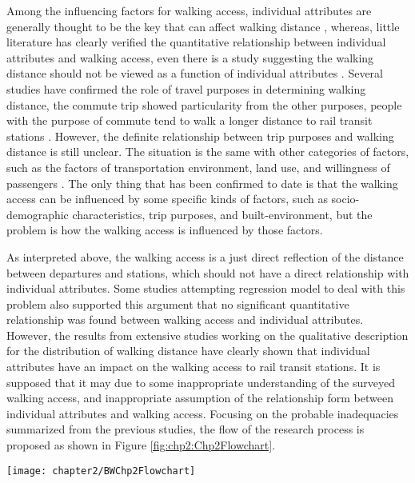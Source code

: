 %
Among the influencing factors for walking access, individual attributes are generally thought to be the key that can affect walking distance \cite{besser2005walking,weinstein2008far,krygsman2004multimodal,yang2012walking,daniels2013explaining,guerra2012half}, whereas, little literature has clearly verified the quantitative relationship between individual attributes and walking access, even there is a study suggesting the walking distance should not be viewed as a function of individual attributes \cite{krygsman2004multimodal}. Several studies have confirmed the role of travel purposes in determining walking distance, the commute trip showed particularity from the other purposes, people with the purpose of commute tend to walk a longer distance to rail transit stations \cite{larsen2010beyond}. However, the definite relationship between trip purposes and walking distance is still unclear. The situation is the same with other categories of factors, such as the factors of transportation environment, land use, and willingness of passengers \cite{guerra2012half,krygsman2004multimodal,weinstein2008far}. The only thing that has been confirmed to date is that the walking access can be influenced by some specific kinds of factors, such as socio-demographic characteristics, trip purposes, and built-environment, but the problem is how the walking access is influenced by those factors. 

As interpreted above, the walking access is a just direct reflection of the distance between departures and stations, which should not have a direct relationship with individual attributes. Some studies attempting regression model to deal with this problem also supported this argument that no significant quantitative relationship was found between walking access and individual attributes. However, the results from extensive studies working on the qualitative description for the distribution of walking distance have clearly shown that individual attributes have an impact on the walking access to rail transit stations. It is supposed that it may due to some inappropriate understanding of the surveyed walking access, and inappropriate assumption of the relationship form between individual attributes and walking access. Focusing on the probable inadequacies summarized from the previous studies, the flow of the research process is proposed as shown in Figure \ref{fig:chp2:Chp2Flowchart}.

\begin{sidewaysfigure}[htbp]
	\centering
	\texttt{[image: chapter2/BWChp2Flowchart]}
	\caption{Research flowchart}
	\label{fig:chp2:Chp2Flowchart}
\end{sidewaysfigure}

